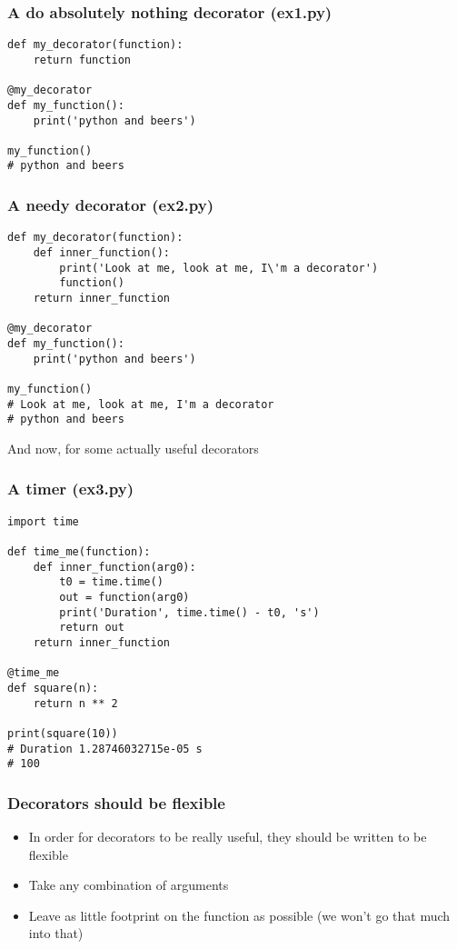 \documentclass{beamer}
\begin{document}
\begin{frame}[fragile]
  \frametitle{A do absolutely nothing decorator (ex1.py)}
\begin{verbatim}
def my_decorator(function):
    return function

@my_decorator
def my_function():
    print('python and beers')

my_function()
# python and beers
\end{verbatim}
\end{frame}

\begin{frame}[fragile]
  \frametitle{A needy decorator (ex2.py)}
\begin{verbatim}
def my_decorator(function):
    def inner_function():
        print('Look at me, look at me, I\'m a decorator')
        function()
    return inner_function

@my_decorator
def my_function():
    print('python and beers')

my_function()
# Look at me, look at me, I'm a decorator
# python and beers
\end{verbatim}
\begin{block}{\vspace*{-3ex}}
  And now, for some actually useful decorators
\end{block}
\end{frame}

\begin{frame}[fragile]
  \frametitle{A timer (ex3.py)}
\begin{verbatim}
import time

def time_me(function):
    def inner_function(arg0):
        t0 = time.time()
        out = function(arg0)
        print('Duration', time.time() - t0, 's')
        return out
    return inner_function

@time_me
def square(n):
    return n ** 2

print(square(10))
# Duration 1.28746032715e-05 s
# 100
\end{verbatim}
\end{frame}

\begin{frame}
  \frametitle{Decorators should be flexible}
  \begin{itemize}
  \item In order for decorators to be really useful, they should be written to
    be flexible
  \item Take any combination of arguments
  \item Leave as little footprint on the function as possible (we won't go
    that much into that)
  \end{itemize}
\end{frame}
\end{document}
